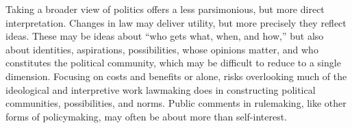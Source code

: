 Taking a broader view of politics offers a less parsimonious, but more direct interpretation. Changes in law may deliver utility, but more precisely they reflect ideas. These may be ideas about ``who gets what, when, and how,'' but also about identities, aspirations, possibilities, whose opinions matter, and who constitutes the political community, which may be difficult to reduce to a single dimension. Focusing on costs and benefits or alone, risks overlooking much of the ideological and interpretive work lawmaking does in constructing political communities, possibilities, and norms. Public comments in rulemaking, like other forms of policymaking, may often be about more than self-interest. 





